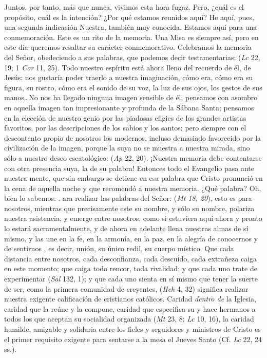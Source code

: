 \begin{body}
Juntos, por tanto, más que nunca, vivimos esta hora fugaz. Pero, ¿cuál es el propósito, cuál es la intención? ¿Por qué estamos reunidos aquí? He aquí, pues, una segunda indicación Nuestra, también muy conocida. Estamos aquí para una conmemoración. Este es un rito de la memoria. Una Misa es siempre así, pero en este día queremos resaltar su carácter conmemorativo. Celebramos la memoria del Señor, obedeciendo a sus palabras, que podemos decir testamentarias:  (\textit{Lc} 22, 19; 1 \textit{Cor} 11, 25). Todo nuestro espíritu está ahora lleno del recuerdo de él, de Jesús: nos gustaría poder traerlo a nuestra imaginación, cómo era, cómo era su figura, su rostro, cómo era el sonido de su voz, la luz de sus ojos, los gestos de sus manos\ldots No nos ha llegado ninguna imagen sensible de él; pensamos con asombro en aquella imagen tan impresionante y profunda de la Sábana Santa; pensamos en la elección de nuestro genio por las piadosas efigies de los grandes artistas favoritos, por las descripciones de los sabios y los santos; pero siempre con el descontento propio de nosotros los modernos, incluso demasiado favorecido por la civilización de la imagen, porque la suya no se muestra a nuestra mirada, sino sólo a nuestro deseo escatológico:  (\textit{Ap} 22, 20). ¡Nuestra memoria debe contentarse con otra presencia suya, la de su palabra! Entonces todo el Evangelio pasa ante nuestra mente, que sin embargo se detiene en esa palabra que Cristo pronunció en la cena de aquella noche y que recomendó a nuestra memoria. ¿Qué palabra? Oh, bien lo sabemos: . ara realizar las palabras del Señor:  (\textit{Mt 18, 20}), esto es para nosotros, mientras que precisamente este su nombre, y sólo su nombre, polariza nuestra asistencia, y emerge entre nosotros, como si estuviera aquí ahora y pronto lo estará sacramentalmente, y de ahora en adelante llena nuestras almas de sí mismo, y las une en la fe, en la armonía, en la paz, en la alegría de conocernos y de sentirnos , es decir, unión, su único redil, su cuerpo místico. Que cada distancia entre nosotros, cada desconfianza, cada descuido, cada extrañeza caiga en este momento; que caiga todo rencor, toda rivalidad; y que cada uno trate de experimentar  (\textit{Sal} 132, 1); y que cada uno sienta en sí mismo que tener la suerte de ser, como la primera comunidad de creyentes,  (\textit{Hch} 4, 32) significa realizar nuestra exigente calificación de cristianos católicos. Caridad \textit{dentro de} la Iglesia, caridad que la reúne y la compone, caridad que especifica su  y hace hermanos a todos los que aceptan su socialidad organizada (\textit{Mt} 23, 8; \textit{Lc} 10, 16), la caridad humilde, amigable y solidaria entre los fieles y seguidores y ministros de Cristo es el primer requisito exigente para sentarse a la mesa el Jueves Santo (Cf. \textit{Lc} 22, 24 ss.). 


\end{body}
